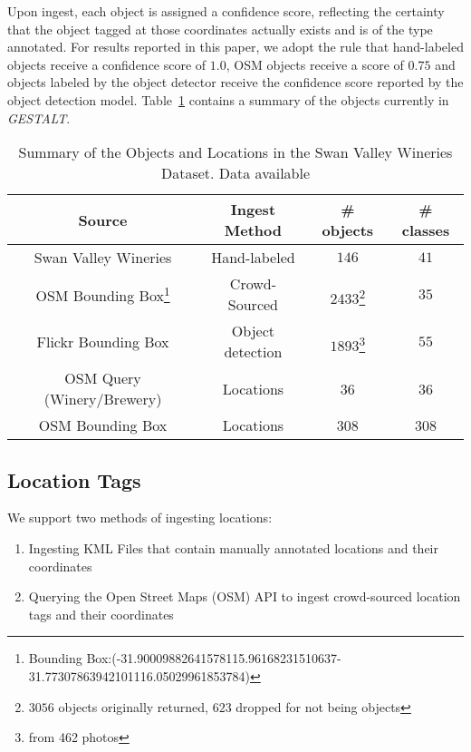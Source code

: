 Upon ingest, each object is assigned a confidence score, reflecting the certainty that the object tagged at those coordinates actually exists and is of the type annotated. 
For results reported in this paper, we adopt the rule that hand-labeled objects receive a confidence score of $1.0$, OSM objects receive a score of $0.75$ and objects labeled by the object detector receive the confidence score reported by the object detection model. Table~\ref{table:objects} contains a summary of the objects currently in \emph{GESTALT}.

\small{
\begin{table}[h!]
	\begin{center}
		\begin{tabular}{ |c|c|c|c| } 
			\hline
			 Source & Ingest Method & \# objects & \# classes  \\
			\hline
                Swan Valley Wineries & Hand-labeled & $146$ & $41$ \\ 
                OSM Bounding Box\footnote{Bounding Box:(-31.90009882641578115.96168231510637-31.77307863942101116.05029961853784)} & Crowd-Sourced & $2433$\footnote{$3056$ objects originally returned, $623$ dropped for not being objects} & $35$ \\ 
			    Flickr Bounding Box & Object detection & $1893$\footnote{from 462 photos} & $55$  \\ 
            \hline
                OSM Query (Winery/Brewery) & Locations & 36 & 36\\
                OSM Bounding Box& Locations & 308 & 308\\

			\hline
		\end{tabular}	
		\caption{Summary of the Objects and Locations in the Swan Valley Wineries Dataset. Data available}
            \label{table:objects}
	\end{center}
\end{table}} 


\subsection{Location Tags}
We support two methods of ingesting locations:
\begin{enumerate}
    \item Ingesting KML Files that contain manually annotated locations and their coordinates 
    \item Querying the Open Street Maps (OSM) API to ingest crowd-sourced location tags and their coordinates 
\end{enumerate}

